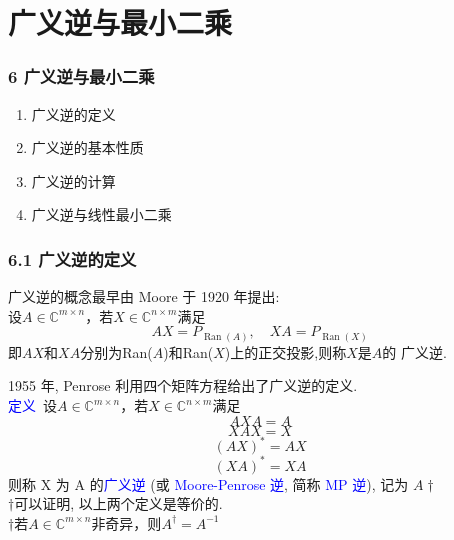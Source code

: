 \documentclass[notheorems,serif]{beamer}
\begin{document}
\section{广义逆与最小二乘}
\begin{frame}
\frametitle{6 广义逆与最小二乘}
\begin{enumerate}[6.1]
	\item 广义逆的定义
	\item 广义逆的基本性质
	\item 广义逆的计算
    \item 广义逆与线性最小二乘
\end{enumerate}
\end{frame}

\begin{frame}
\frametitle{6.1 广义逆的定义}
\noindent 广义逆的概念最早由 Moore 于 1920 年提出:\\

设$A \in \mathbb{C}^{m \times n}$，若$X \in \mathbb{C}^{n \times m}$满足
\begin{equation}
A X=P_{\operatorname{Ran}(A)}, \quad X A=P_{\operatorname{Ran}(X)}
\end{equation}
即$AX$和$XA$分别为Ran($A$)和Ran($X$)上的正交投影,则称$X$是$A$的
广义逆.
\end{frame}

\begin{frame}
1955 年, Penrose 利用四个矩阵方程给出了广义逆的定义.\\

\textcolor{blue}{定义}~设$A \in \mathbb{C}^{m \times n}$，若$X \in \mathbb{C}^{n \times m}$满足
\begin{equation}
AXA=A 
\end{equation} 
\begin{equation}
XAX=X
\end{equation}
\begin{equation}
(AX)^*=AX
\end{equation}
\begin{equation}
(X A)^{*}=X A 
\end{equation}
则称 X 为 A 的\textcolor{blue}{广义逆} (或 \textcolor{blue}{Moore-Penrose 逆}, 简称 \textcolor{blue}{MP 逆}), 记为 $A\dagger$\\

$\dagger$可以证明, 以上两个定义是等价的.\\

$\dagger$若$A \in \mathbb{C}^{m \times n}$非奇异，则$A^{\dagger}=A^{-1}$
\end{frame}
\end{document}
